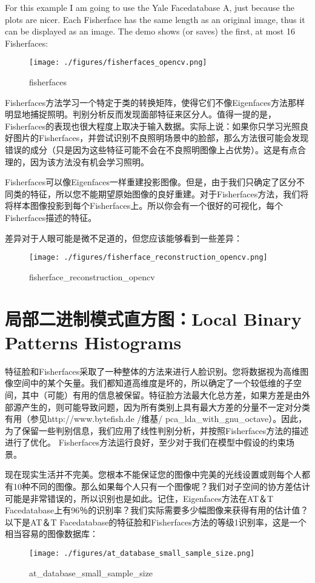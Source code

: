 \documentclass[UTF8]{ctexart}
\begin{document}
For this example I am going to use the Yale Facedatabase A, just because the plots are nicer. Each Fisherface has the same length as an original image, thus it can be displayed as an image. The demo shows (or saves) the first, at most 16 Fisherfaces:
\begin{figure}[htbp]
	\centerline{\texttt{[image: ./figures/fisherfaces\_opencv.png]}}
	\caption{fisherfaces}
\end{figure}

Fisherfaces方法学习一个特定于类的转换矩阵，使得它们不像Eigenfaces方法那样明显地捕捉照明。判别分析反而发现面部特征来区分人。值得一提的是，Fisherfaces的表现也很大程度上取决于输入数据。实际上说：如果你只学习光照良好图片的Fisherfaces，并尝试识别不良照明场景中的脸部，那么方法很可能会发现错误的成分（只是因为这些特征可能不会在不良照明图像上占优势）。这是有点合理的，因为该方法没有机会学习照明。

Fisherfaces可以像Eigenfaces一样重建投影图像。但是，由于我们只确定了区分不同类的特征，所以您不能期望原始图像的良好重建。对于Fisherfaces方法，我们将将样本图像投影到每个Fisherfaces上。所以你会有一个很好的可视化，每个Fisherfaces描述的特征。

差异对于人眼可能是微不足道的，但您应该能够看到一些差异：
\begin{figure}[htbp]
	\centerline{\texttt{[image: ./figures/fisherface\_reconstruction\_opencv.png]}}
	\caption{fisherface\_reconstruction\_opencv}
\end{figure}

\section{局部二进制模式直方图：Local Binary Patterns Histograms}
特征脸和Fisherfaces采取了一种整体的方法来进行人脸识别。您将数据视为高维图像空间中的某个矢量。我们都知道高维度是坏的，所以确定了一个较低维的子空间，其中（可能）有用的信息被保留。特征脸方法最大化总方差，如果方差是由外部源产生的，则可能导致问题，因为所有类别上具有最大方差的分量不一定对分类有用（参见http://www.bytefish.de /维基/ pca\_lda\_with\_gnu\_octave）。因此，为了保留一些判别信息，我们应用了线性判别分析，并按照Fisherfaces方法的描述进行了优化。 Fisherfaces方法运行良好，至少对于我们在模型中假设的约束场景。

现在现实生活并不完美。您根本不能保证您的图像中完美的光线设置或则每个人都有10种不同的图像。那么如果每个人只有一个图像呢？我们对子空间的协方差估计可能是非常错误的，所以识别也是如此。记住，Eigenfaces方法在AT＆T Facedatabase上有96％的识别率？我们实际需要多少幅图像来获得有用的估计值？以下是AT＆T Facedatabase的特征脸和Fisherfaces方法的等级1识别率，这是一个相当容易的图像数据库：
\begin{figure}[htbp]
	\centerline{\texttt{[image: ./figures/at\_database\_small\_sample\_size.png]}}
	\caption{at\_database\_small\_sample\_size}
\end{figure}
\end{document}
